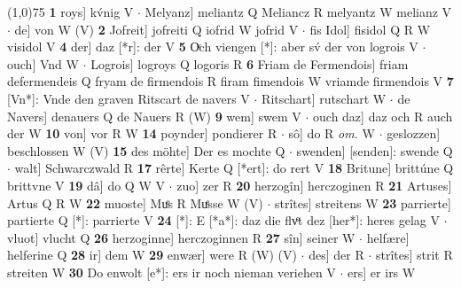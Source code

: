 \documentclass[8pt,a4paper,notitlepage]{article}
\begin{document}
\begin{table}[ht]
\begin{minipage}[t]{0.5\linewidth}
\line(1,0){75} \newline
\textbf{1} roys] kv́nig V  $\cdot$ Melyanz] meliantz Q Meliancz R melyantz W melianz V  $\cdot$ de] von W (V) \textbf{2} Jofreit] jofreiti Q iofrid W jofrid V  $\cdot$ fis Idol] fisidol Q R W visidol V \textbf{4} der] daz [*r]: der V \textbf{5} Oͮch viengen [*]: aber sv́ der von logrois V  $\cdot$ ouch] Vnd W  $\cdot$ Logrois] logroys Q logoris R \textbf{6} Friam de Fermendois] friam defermendeis Q fryam de firmendois R firam fimendois W vriamde firmendois V \textbf{7} [Vn*]: Vnde den graven Ritscart de navers V  $\cdot$ Ritschart] rutschart W  $\cdot$ de Navers] denauers Q de Nauers R (W) \textbf{9} wem] swem V  $\cdot$ ouch daz] daz och R auch der W \textbf{10} von] vor R W \textbf{14} poynder] pondierer R  $\cdot$ sô] do R \textit{om.} W  $\cdot$ geslozzen] beschlossen W (V) \textbf{15} des möhte] Der es mochte Q  $\cdot$ swenden] [senden]: swende Q  $\cdot$ walt] Schwarczwald R \textbf{17} rêrte] Kerte Q [*ert]: do rert V \textbf{18} Britune] brittúne Q brittvne V \textbf{19} dâ] do Q W V  $\cdot$ zuo] zer R \textbf{20} herzogîn] herczoginen R \textbf{21} Artuses] Artus Q R W \textbf{22} muoste] Muͦs R Muͤsse W (V)  $\cdot$ strîtes] streitens W \textbf{23} parrierte] partierte Q [*]: parrierte V \textbf{24} [*]: E [*a*]: daz die flvͦt dez [her*]: heres gelag V  $\cdot$ vluot] vlucht Q \textbf{26} herzoginne] herczoginnen R \textbf{27} sîn] seiner W  $\cdot$ helfære] helferine Q \textbf{28} ir] dem W \textbf{29} enwær] were R (W) (V)  $\cdot$ des] der R  $\cdot$ strîtes] strit R streiten W \textbf{30} Do enwolt [e*]: ers ir noch nieman veriehen V  $\cdot$ ers] er irs W \newline
\end{minipage}
\end{table}
\end{document}
